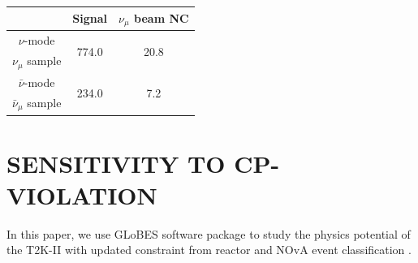 \documentclass[a4 paper,12pt]{report}%
\def\Mr{\uppercase}
\begin{document}
\begin{center}
\label{tab:novanumu}
\begin{tabular}{|c| c| c| }
\hline
 & Signal & $\nu_\mu$ beam NC  \\ 
 \hline  
 $\nu$-mode &  \multirow{2}{*}{774.0} & \multirow{2}{*}{20.8}  \\
 $\nu_\mu$ sample &&\\ 
\hline 
$\bar{\nu}$-mode &  \multirow{2}{*}{234.0} &\multirow{2}{*}{7.2}  \\
 $\bar{\nu}_\mu$ sample & &\\ 
\hline 
\end{tabular} 
\end{center}
\section{\Mr{Sensitivity to CP-violation}}\label{sec:results}
In this paper, we use GLoBES software package \cite{Huber:2002mx}  to study the physics potential of the T2K-II with updated constraint from reactor \cite{Cao:2016vwh} and NOvA event classification \cite{Adamson:2017gxd}. \par 
\end{document}
